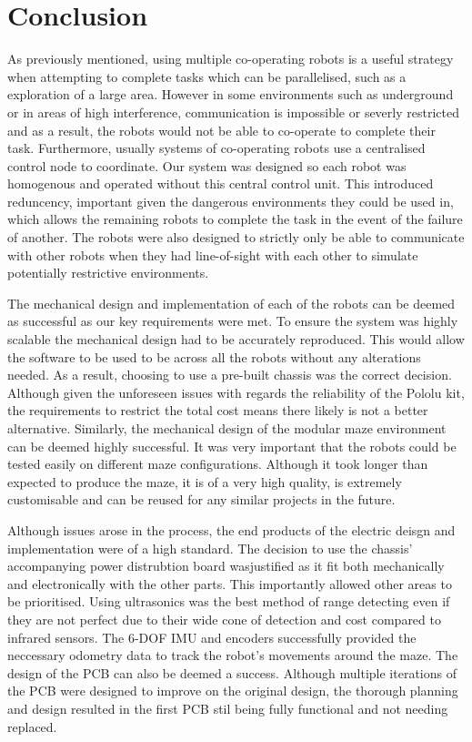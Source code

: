 
\chapter{Conclusion}\label{conclusion}

As previously mentioned, using multiple co-operating robots is a useful strategy 
when attempting to complete tasks which can be parallelised, such as a exploration
of a large area. However in some environments such as underground or in areas of 
high interference, communication is impossible or severly restricted and as a result,
the robots would not be able to co-operate to complete their task. Furthermore,
usually systems of co-operating robots use a centralised control node to coordinate. 
Our system was designed so each robot was homogenous and operated without 
this central control unit. This introduced reduncency, important given the dangerous
environments they could be used in, which allows the remaining robots to complete
the task in the event of the failure of another. The robots were also designed to
strictly only be able to communicate with other robots when they had line-of-sight
with each other to simulate potentially restrictive environments.  

The mechanical design and implementation of each of the robots can be deemed as 
successful as our key requirements were met. To ensure the system was highly 
scalable the mechanical design had to be accurately reproduced. This would allow the 
software to be used to be across all the robots without any alterations needed. As a 
result, choosing to use a pre-built chassis was the correct decision. Although given 
the unforeseen issues with regards the reliability of the Pololu kit, the 
requirements to restrict the total cost means there likely is not a better 
alternative. Similarly, the mechanical design of the modular maze environment can
be deemed highly successful. It was very important that the robots could be 
tested easily on different maze configurations. Although it took longer than 
expected to produce the maze, it is of a very high quality, is extremely 
customisable and can be reused for any similar projects in the future.

Although issues arose in the process, the end products of the electric deisgn
and implementation were of a high standard. The decision to use the chassis'
accompanying power distrubtion board wasjustified as it fit both
mechanically and electronically with the other parts. This importantly allowed
other areas to be prioritised. Using ultrasonics was the best method of range 
detecting even if they are not perfect due to their wide cone of detection and
cost compared to infrared sensors. The 6-DOF IMU and encoders successfully
provided the neccessary odometry data to track the robot's movements around the
maze. The design of the PCB can also be deemed a success. Although multiple 
iterations of the PCB were designed to improve on the original design, the
thorough planning and design resulted in the first PCB stil being fully functional 
and not needing replaced. 

